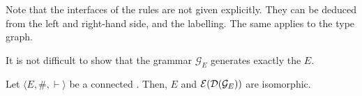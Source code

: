 \smallskip

Note that the interfaces of the rules are not given explicitly. They
can be deduced from the left and right-hand side, and the
labelling. The same applies to the type graph.

%
It is not difficult to show that the grammar
$\mathcal{G}_{E}$ generates exactly the {\esabbr} ${E}$. 

\begin{theorem}
  Let $\langle E, \#, \vdash \rangle$ be a 
  connected {\esabbr}.  Then,
  ${E}$ and $\mathcal{E}({\mathcal{D}({\mathcal{G}_{E}})})$ are isomorphic.
\end{theorem}

